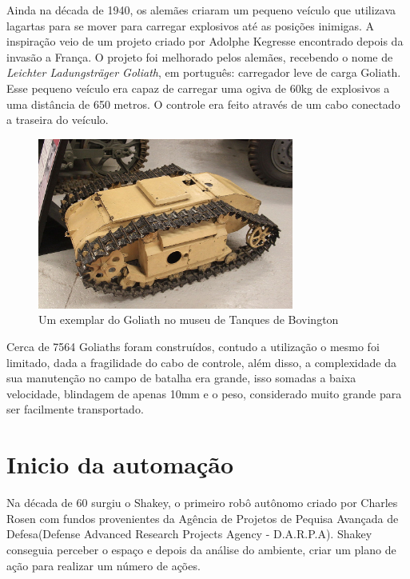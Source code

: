 Ainda na década de 1940, os alemães criaram um pequeno veículo que utilizava lagartas para se mover para carregar explosivos até as posições inimigas. A inspiração veio de um projeto criado por Adolphe Kegresse encontrado depois da invasão a França. O projeto foi melhorado pelos alemães, recebendo o nome de \textit{Leichter Ladungsträger Goliath}, em português: carregador leve de carga Goliath. Esse pequeno veículo era capaz de carregar uma ogiva de 60kg de explosivos a uma distância de 650 metros. O controle era feito através de um cabo conectado a traseira do veículo. 
\begin{figure}[!htb]
    \centering
    \includegraphics[width=0.75\textwidth]{figuras/goliath.JPG}
    \caption{Um exemplar do Goliath no museu de Tanques de Bovington}
    \label{fig:goliath:museu}
\end{figure}
Cerca de 7564 Goliaths foram construídos, contudo a utilização o mesmo foi limitado, dada a fragilidade do cabo de controle, além disso, a complexidade da sua manutenção no campo de batalha era grande, isso somadas a baixa velocidade, blindagem de apenas 10mm e o peso, considerado muito grande para ser facilmente transportado.
\section{Inicio da automação}
Na década de 60 surgiu o Shakey, o primeiro robô autônomo criado por Charles Rosen com fundos provenientes da Agência de Projetos de Pequisa Avançada de Defesa(Defense Advanced Research Projects Agency - D.A.R.P.A). Shakey conseguia perceber o espaço e depois da análise do ambiente, criar um plano de ação para realizar um número de ações. 

